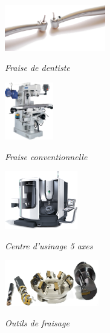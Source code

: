 \documentclass[11pt,oneside]{article}
\begin{document}
\begin{minipage}[c]{.23\linewidth}
\begin{center}
\includegraphics[height=2cm]{png/fraise_dentiste}

\textit{Fraise de dentiste \cite{dent}}
\end{center}
\end{minipage} \hfill
\begin{minipage}[c]{.23\linewidth}
\begin{center}
\includegraphics[height=2.5cm]{png/fraise_conventionnelle}

\textit{Fraise conventionnelle \cite{conventionnel}}
\end{center}
\end{minipage} \hfill
\begin{minipage}[c]{.23\linewidth}
\begin{center}
\includegraphics[height=2.5cm]{png/5axes}

\textit{Centre d'usinage 5 axes \cite{5axes}}
\end{center}
\end{minipage}\hfill
\begin{minipage}[c]{.23\linewidth}
\begin{center}
\includegraphics[height=2cm]{png/fraises}

\textit{Outils de fraisage \cite{fraises}}
\end{center}
\end{minipage}
\end{document}
